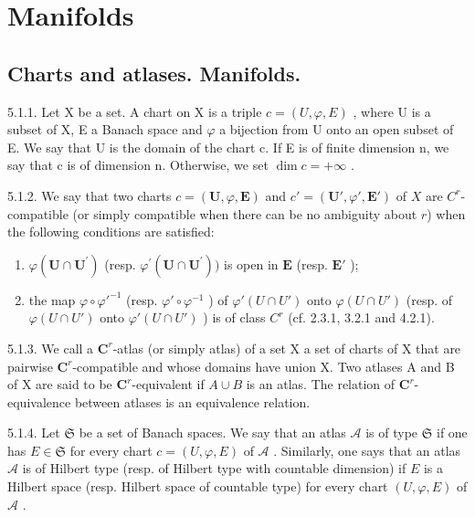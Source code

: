 \section{Manifolds}

\subsection{Charts and atlases. Manifolds.}

5.1.1. Let X be a set. A chart on X is a triple \(c = (U, \varphi, E)\) , where U is a subset of X, E a Banach space and \(\varphi\) a bijection from U onto an open subset of E. We say that U is the domain of the chart c. If E is of finite dimension n, we say that c is of dimension n. Otherwise, we set \(\dim c = +\infty\) .

5.1.2. We say that two charts \(c = (\mathbf{U}, \varphi, \mathbf{E})\) and \(c' = (\mathbf{U}', \varphi', \mathbf{E}')\) of \(X\) are \(C^r\)-compatible (or simply compatible when there can be no ambiguity about \(r\)) when the following conditions are satisfied:

\begin{enumerate}
\def\labelenumi{(\alph{enumi})}
\item
  \(\varphi (\mathbf{U}\cap \mathbf{U}^{\prime})\) (resp. \(\varphi^{\prime}(\mathbf{U}\cap \mathbf{U}^{\prime}))\) is open in \(\mathbf{E}\) (resp. \(\mathbf{E}'\) );
\item
  the map \(\varphi \circ \varphi'^{-1}\) (resp. \(\varphi' \circ \varphi^{-1}\) ) of \(\varphi'(U \cap U')\) onto \(\varphi(U \cap U')\) (resp. of \(\varphi(U \cap U')\) onto \(\varphi'(U \cap U')\) ) is of class \(C^r\) (cf. 2.3.1, 3.2.1 and 4.2.1).
\end{enumerate}

5.1.3. We call a \(\mathbf{C}^{r}\)-atlas (or simply atlas) of a set X a set of charts of X that are pairwise \(\mathbf{C}^{r}\)-compatible and whose domains have union X. Two atlases A and B of X are said to be \(\mathbf{C}^{r}\)-equivalent if \(A \cup B\) is an atlas. The relation of \(\mathbf{C}^{r}\)-equivalence between atlases is an equivalence relation.

5.1.4. Let \(\mathfrak{S}\) be a set of Banach spaces. We say that an atlas \(\mathcal{A}\) is of type \(\mathfrak{S}\) if one has \(E \in \mathfrak{S}\) for every chart \(c = (U, \varphi, E)\) of \(\mathcal{A}\) . Similarly, one says that an atlas \(\mathcal{A}\) is of Hilbert type (resp. of Hilbert type with countable dimension) if \(E\) is a Hilbert space (resp. Hilbert space of countable type) for every chart \((U, \varphi, E)\) of \(\mathcal{A}\) .

